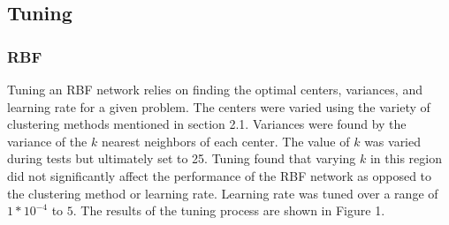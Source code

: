 \documentclass[twoside,10pt]{article}
\begin{document}
\subsection{Tuning}
\subsubsection{RBF}
Tuning an RBF network relies on finding the optimal centers, variances, and learning rate for a given problem. The centers were varied using the variety of clustering methods mentioned in section 2.1. Variances were found by the variance of the $k$ nearest neighbors of each center. The value of $k$ was varied during tests but ultimately set to 25. Tuning found that varying $k$ in this region did not significantly affect the performance of the RBF network as opposed to the clustering method or learning rate. Learning rate was tuned over a range of $1*10^{-4}$ to $5$. The results of the tuning process are shown in Figure 1. 
\end{document}

